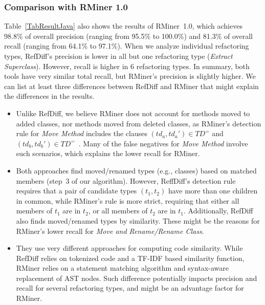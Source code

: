 \subsubsection{Comparison with RMiner 1.0}

Table~\ref{TabResultJava} also shows the results of RMiner~1.0, which achieves 98.8\% of overall precision (ranging from 95.5\% to 100.0\%) and 81.3\% of overall recall (ranging from 64.1\% to 97.1\%).
When we analyze individual refactoring types, RefDiff's precision is lower in all but one refactoring type (\emph{Extract Superclass}). However, recall is higher in 6 refactoring types.
In summary, both tools have very similar total recall, but RMiner's precision is slightly higher.
We can list at least three differences between RefDiff and RMiner that might explain the differences in the results.
\begin{itemize}

\item Unlike RefDiff, we believe RMiner does not account for methods moved to added classes, nor methods moved from deleted classes, as RMiner's detection rule for \emph{Move Method} includes the clauses $(\mathit{td}_a, \mathit{td}_a') \in TD^=$ and $(\mathit{td}_b, \mathit{td}_b') \in TD^=$~\cite{tsantalis2018rminer}.
Many of the false negatives for \emph{Move Method} involve such scenarios, which explains the lower recall for RMiner.


\item Both approaches find moved/renamed types (e.g., classes) based on matched members (step~3 of our algorithm). However, ReffDiff's detection rule requires that a pair of candidate types $(t_1, t_2)$ have more than one children in common, while RMiner's rule is more strict, requiring that either all members of $t_1$ are in $t_2$, or all members of $t_2$ are in $t_1$.
Additionally, RefDiff also finds moved/renamed types by similarity. 
These might be the reasons for RMiner's lower recall for \emph{Move and Rename/Rename Class}.

\item They use very different approaches for computing code similarity. While RefDiff relies on tokenized code and a TF-IDF based similarity function, RMiner relies on a statement matching algorithm and syntax-aware replacement of AST nodes.
Such difference potentially impacts precision and recall for several refactoring types, and might be an advantage factor for RMiner.
\end{itemize}

